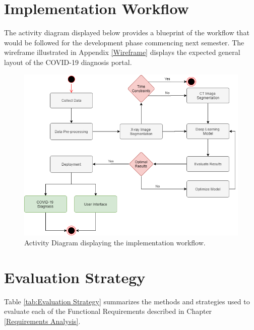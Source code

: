 \vspace{-2em}
\section{Implementation Workflow}
The activity diagram displayed below provides a blueprint of the workflow that would be followed for the development phase commencing next semester. The wireframe illustrated in Appendix \ref{Wireframe} displays the expected general layout of the COVID-19 diagnosis portal.

\begin{figure}[H]
 \centering
 \includegraphics[width=15.5cm]{Images/Implementation Workflow.png}
 \decoRule
 \caption[Implementation Methodology]{Activity Diagram displaying the implementation workflow.}
 \label{fig:Implementation Methodology}
 \end{figure}
 
 \vspace{-2em}
\section{Evaluation Strategy} \label{Evaluation Strategy Section}
Table \ref{tab:Evaluation Strategy} summarizes the methods and strategies used to evaluate each of the Functional Requirements described in Chapter \ref{Requirements Analysis}.

